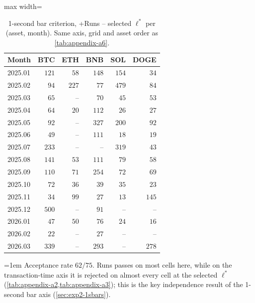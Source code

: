 \documentclass[11pt,titlepage,openany,oneside]{book}  %
\newcommand{\floatnote}[1]{%
  \par\smallskip\noindent%
  \begin{minipage}{\linewidth}%
    \footnotesize\emergencystretch=1em #1%
  \end{minipage}\par%
}
\begin{document}
\begin{table}[!htbp]
  \caption[1-second bar +Runs criterion -- selected $\ell^*$]{1-second bar criterion, +Runs -- selected $\ell^*$ per (asset, month). Same axis, grid and asset order as \cref{tab:appendix-a6}.}
  \label{tab:appendix-a6b}
  \begin{center}
    \begin{adjustbox}{max width=\textwidth}
    \begin{tabular}{lrrrrr}
      \toprule
      Month   & BTC   & ETH   & BNB   & SOL   & DOGE  \\
      \midrule
      2025.01 & $121$ & $58$  & $148$ & $154$ & $34$  \\
      2025.02 & $94$  & $227$ & $77$  & $479$ & $84$  \\
      2025.03 & $65$  & --    & $70$  & $45$  & $53$  \\
      2025.04 & $64$  & $20$  & $112$ & $26$  & $27$  \\
      2025.05 & $92$  & --    & $327$ & $200$ & $92$  \\
      2025.06 & $49$  & --    & $111$ & $18$  & $19$  \\
      2025.07 & $233$ & --    & --    & $319$ & $43$  \\
      2025.08 & $141$ & $53$  & $111$ & $79$  & $58$  \\
      2025.09 & $110$ & $71$  & $254$ & $72$  & $69$  \\
      2025.10 & $72$  & $36$  & $39$  & $35$  & $23$  \\
      2025.11 & $34$  & $99$  & $27$  & $13$  & $145$ \\
      2025.12 & $500$ & --    & $91$  & --    & --    \\
      2026.01 & $47$  & $50$  & $76$  & $24$  & $16$  \\
      2026.02 & $22$  & --    & $27$  & --    & --    \\
      2026.03 & $339$ & --    & $293$ & --    & $278$ \\
      \bottomrule
    \end{tabular}
    \end{adjustbox}
  \end{center}
  \floatnote{Acceptance rate $62/75$. Runs passes on most cells here, while on the transaction-time axis it is rejected on almost every cell at the selected $\ell^*$ (\cref{tab:appendix-a2,tab:appendix-a3}); this is the key independence result of the 1-second bar axis (\cref{sec:exp2-1sbars}).}
\end{table}
\end{document}
